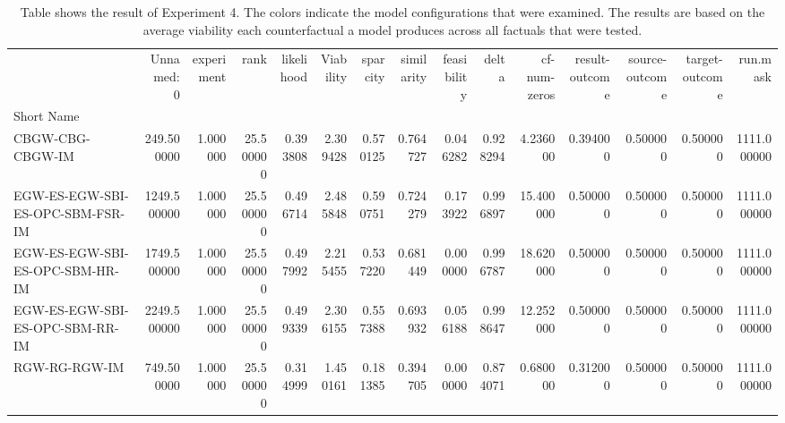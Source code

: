 \begin{table}
\caption{Table shows the result of Experiment 4. The colors indicate the model configurations that were examined. The results are based on the average viability each counterfactual a model produces across all factuals that were tested.}
\label{tbl:exp4-winner}
\begin{tabular}{lrrrrrrrrrrrrrr}
 & Unnamed: 0 & experiment & rank & likelihood & Viability & sparcity & similarity & feasibility & delta & cf-num-zeros & result-outcome & source-outcome & target-outcome & run.mask \\
Short Name &  &  &  &  &  &  &  &  &  &  &  &  &  &  \\
CBGW-CBG-CBGW-IM & 249.500000 & 1.000000 & 25.500000 & 0.393808 & 2.309428 & 0.570125 & 0.764727 & 0.046282 & 0.928294 & 4.236000 & 0.394000 & 0.500000 & 0.500000 & 1111.000000 \\
EGW-ES-EGW-SBI-ES-OPC-SBM-FSR-IM & 1249.500000 & 1.000000 & 25.500000 & 0.496714 & 2.485848 & 0.590751 & 0.724279 & 0.173922 & 0.996897 & 15.400000 & 0.500000 & 0.500000 & 0.500000 & 1111.000000 \\
EGW-ES-EGW-SBI-ES-OPC-SBM-HR-IM & 1749.500000 & 1.000000 & 25.500000 & 0.497992 & 2.215455 & 0.537220 & 0.681449 & 0.000000 & 0.996787 & 18.620000 & 0.500000 & 0.500000 & 0.500000 & 1111.000000 \\
EGW-ES-EGW-SBI-ES-OPC-SBM-RR-IM & 2249.500000 & 1.000000 & 25.500000 & 0.499339 & 2.306155 & 0.557388 & 0.693932 & 0.056188 & 0.998647 & 12.252000 & 0.500000 & 0.500000 & 0.500000 & 1111.000000 \\
RGW-RG-RGW-IM & 749.500000 & 1.000000 & 25.500000 & 0.314999 & 1.450161 & 0.181385 & 0.394705 & 0.000000 & 0.874071 & 0.680000 & 0.312000 & 0.500000 & 0.500000 & 1111.000000 \\
\end{tabular}
\end{table}
